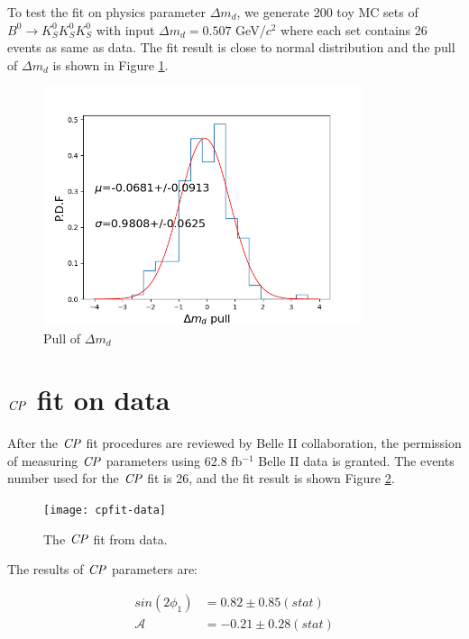 To test the fit on physics parameter $\Delta m_d$, we generate 200 toy MC sets of $B^0 \to K_S^0  K_S^0  K_S^0$ with input $\Delta m_d = 0.507 $ GeV/$c^2$ where each set contains 26 events as same as data. The fit result is close to normal distribution and the pull of $\Delta m_d$ is shown in Figure \ref{fig:cpfit_dm_pull}. 
\begin{figure}[htpb]
	\centering
	\includegraphics[height=7cm]{figures/pull_hist_dm}
	\caption{Pull of $\Delta m_d$}
	\label{fig:cpfit_dm_pull}
\end{figure}

\section{$\it{CP}$ fit on data}
After the $\it{CP}$ fit procedures are reviewed by Belle II collaboration, the permission of measuring $\it{CP}$ parameters using 62.8 fb$^{-1}$ Belle II data is granted. The events number used for the $\it{CP}$ fit is 26, and the fit result is shown Figure \ref{fig:cpfit_data}.

\begin{figure}[H]
	\centering
	\texttt{[image: cpfit-data]}
	\caption{The $\it{CP}$ fit from data.}
	\label{fig:cpfit_data}
\end{figure}

The results of $\it{CP}$ parameters are: 

\begin{equation}
\begin{split}
sin(2\phi_1) & = 0.82 \pm 0.85(stat) \\
\mathcal{A} & = -0.21 \pm 0.28(stat) \\
\end{split}
\end{equation} 

